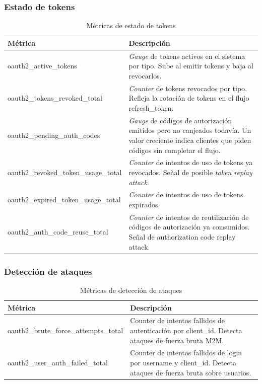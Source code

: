 \documentclass[12pt, a4paper]{article}
\begin{document}
		\subsubsection{Estado de tokens}
			\begin{table}[H]
				\centering
				\begin{tabular}{>{\ttfamily\small}lp{8cm}}
					\toprule
					\textbf{Métrica} & \textbf{Descripción} \\
					\midrule
					oauth2\_active\_tokens & \textit{Gauge }de tokens activos en el sistema por tipo.
					Sube al emitir tokens y baja al revocarlos. \\
					oauth2\_tokens\_revoked\_total & \textit{Counter} de tokens revocados por tipo.
					Refleja la rotación de tokens en el flujo refresh\_token. \\
					oauth2\_pending\_auth\_codes & \textit{Gauge} de códigos de autorización emitidos
					pero no canjeados todavía. Un valor creciente indica clientes que piden
					códigos sin completar el flujo. \\
					oauth2\_revoked\_token\_usage\_total & \textit{Counter} de intentos de uso de tokens
					ya revocados. Señal de posible \textit{token replay attack}. \\
					oauth2\_expired\_token\_usage\_total & \textit{Counter} de intentos de uso de tokens
					expirados. \\
					oauth2\_auth\_code\_reuse\_total & \textit{Counter }de intentos de reutilización de
					códigos de autorización ya consumidos. Señal de authorization code replay
					attack. \\
					\bottomrule
				\end{tabular}
				\caption{Métricas de estado de tokens}
			\end{table}
		
		\subsubsection{Detección de ataques}
	
			\begin{table}[H]
				\centering
				\begin{tabular}{>{\ttfamily\small}lp{8cm}}
					\toprule
					\textbf{Métrica} & \textbf{Descripción} \\
					\midrule
					oauth2\_brute\_force\_attempts\_total & Counter de intentos fallidos de
					autenticación por client\_id. Detecta ataques de fuerza bruta M2M. \\
					oauth2\_user\_auth\_failed\_total & Counter de intentos fallidos de login
					por username y client\_id. Detecta ataques de fuerza bruta sobre usuarios. \\
					\bottomrule
				\end{tabular}
				\caption{Métricas de detección de ataques}
			\end{table}
	
\end{document}
